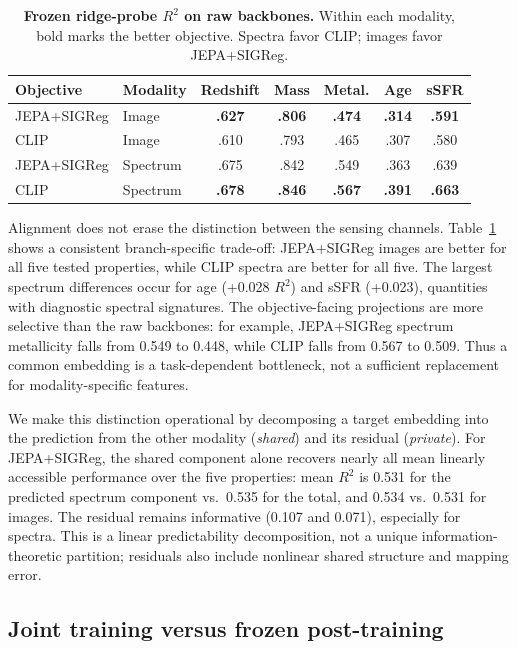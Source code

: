 \documentclass{article}
\begin{document}
\begin{table}[t]
\centering
\caption{\textbf{Frozen ridge-probe $R^2$ on raw backbones.} Within each modality, bold marks the better objective. Spectra favor CLIP; images favor JEPA+SIGReg.}
\label{tab:probes}
\small
\setlength{\tabcolsep}{4.2pt}
\begin{tabular}{llccccc}
\toprule
Objective & Modality & Redshift & Mass & Metal. & Age & sSFR \\
\midrule
JEPA+SIGReg & Image    & \textbf{.627} & \textbf{.806} & \textbf{.474} & \textbf{.314} & \textbf{.591} \\
CLIP & Image  & .610 & .793 & .465 & .307 & .580 \\
JEPA+SIGReg & Spectrum & .675 & .842 & .549 & .363 & .639 \\
CLIP & Spectrum & \textbf{.678} & \textbf{.846} & \textbf{.567} & \textbf{.391} & \textbf{.663} \\
\bottomrule
\end{tabular}
\end{table}

Alignment does not erase the distinction between the sensing channels.
Table~\ref{tab:probes} shows a consistent branch-specific trade-off: JEPA+SIGReg images are better for all five tested properties, while CLIP spectra are better for all five.
The largest spectrum differences occur for age (+0.028 $R^2$) and sSFR (+0.023), quantities with diagnostic spectral signatures.
The objective-facing projections are more selective than the raw backbones: for example, JEPA+SIGReg spectrum metallicity falls from 0.549 to 0.448, while CLIP falls from 0.567 to 0.509.
Thus a common embedding is a task-dependent bottleneck, not a sufficient replacement for modality-specific features.

We make this distinction operational by decomposing a target embedding into the prediction from the other modality (\emph{shared}) and its residual (\emph{private}).
For JEPA+SIGReg, the shared component alone recovers nearly all mean linearly accessible performance over the five properties: mean $R^2$ is 0.531 for the predicted spectrum component vs.\ 0.535 for the total, and 0.534 vs.\ 0.531 for images.
The residual remains informative (0.107 and 0.071), especially for spectra.
This is a linear predictability decomposition, not a unique information-theoretic partition; residuals also include nonlinear shared structure and mapping error.

\subsection{Joint training versus frozen post-training}
\end{document}
